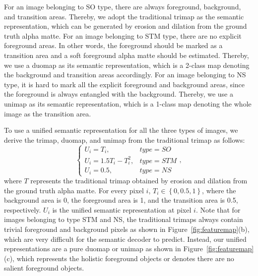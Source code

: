 \documentclass{article}
\begin{document}
For an image belonging to SO type, there are always foreground, background, and transition areas. Thereby, we adopt the traditional trimap as the semantic representation, which can be generated by erosion and dilation from the ground truth alpha matte. For an image belonging to STM type, there are no explicit foreground areas. In other words, the foreground should be marked as a transition area and a soft foreground alpha matte should be estimated. Thereby, we use a duomap as its semantic representation, which is a 2-class map denoting the background and transition areas accordingly. For an image belonging to NS type, it is hard to mark all the explicit foreground and background areas, since the foreground is always entangled with the background. Thereby, we use a unimap as its semantic representation, which is a 1-class map denoting the whole image as the transition area. 

To use a unified semantic representation for all the three types of images, we derive the trimap, duomap, and unimap from the traditional trimap as follows:
\begin{equation}
\left\{
             \begin{array}{lr}
            U_i = T_i, &type=SO  \\
              U_i = 1.5T_i-T_i^{2} , & type=STM  \\
            U_i = 0.5, &type=NS  
             \end{array},
\right.
\label{eqa:newtri}
\end{equation}
where $T$ represents the traditional trimap obtained by erosion and dilation from the ground truth alpha matte. For every pixel $i$, $T_{i}\in \left \{ 0, 0.5, 1 \right \}$, where the background area is 0, the foreground area is 1, and the transition area is 0.5, respectively. $U_{i}$ is the unified semantic representation at pixel $i$. Note that for images belonging to type STM and NS, the traditional trimaps always contain trivial foreground and background pixels as shown in Figure~\ref{fig:featuremap}(b), which are very difficult for the semantic decoder to predict. Instead, our unified representations are a pure duomap or unimap as shown in Figure~\ref{fig:featuremap}(c), which represents the holistic foreground objects or denotes there are no salient foreground objects.
\end{document}
